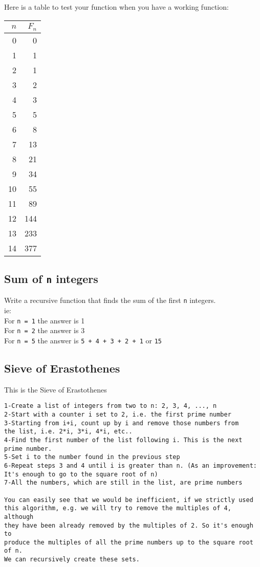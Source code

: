 \documentclass[11pt]{article}
\begin{document}
Here is a table to test your function when you have a working function:\\
\begin{center}
\begin{tabular}{rr}
\(n\) & \(F_n\)\\
\hline
0 & 0\\
1 & 1\\
2 & 1\\
3 & 2\\
4 & 3\\
5 & 5\\
6 & 8\\
7 & 13\\
8 & 21\\
9 & 34\\
10 & 55\\
11 & 89\\
12 & 144\\
13 & 233\\
14 & 377\\
\end{tabular}
\end{center}

\subsection{Sum of \texttt{n} integers}
\label{sec:org149d895}
Write a recursive function that finds the sum of the first \texttt{n} integers.\\

ie:\\

For \texttt{n = 1} the answer is 1\\
For \texttt{n = 2} the answer is 3\\
For \texttt{n = 5} the answer is \texttt{5 + 4 + 3 + 2 + 1} or \texttt{15}\\

\subsection{Sieve of Erastothenes}
\label{sec:org693f133}
This is the Sieve of Erastothenes\\
\begin{verbatim}
1-Create a list of integers from two to n: 2, 3, 4, ..., n
2-Start with a counter i set to 2, i.e. the first prime number
3-Starting from i+i, count up by i and remove those numbers from
the list, i.e. 2*i, 3*i, 4*i, etc..
4-Find the first number of the list following i. This is the next
prime number.
5-Set i to the number found in the previous step
6-Repeat steps 3 and 4 until i is greater than n. (As an improvement:
It's enough to go to the square root of n)
7-All the numbers, which are still in the list, are prime numbers

You can easily see that we would be inefficient, if we strictly used
this algorithm, e.g. we will try to remove the multiples of 4, although
they have been already removed by the multiples of 2. So it's enough to
produce the multiples of all the prime numbers up to the square root of n.
We can recursively create these sets.
\end{verbatim}
\end{document}
